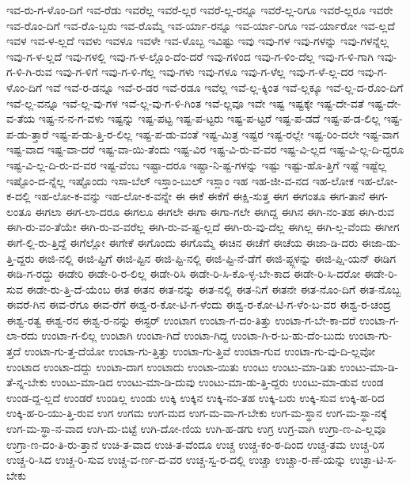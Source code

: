 {ಇವ-ರು-ಗ-ಳೊಂ-ದಿಗೆ
ಇವ-ರೆಡು
ಇವರೆಲ್ಲ
ಇವರೆ-ಲ್ಲರ
ಇವರೆ-ಲ್ಲ-ರನ್ನೂ
ಇವರೆ-ಲ್ಲ-ರಿಗೂ
ಇವರೆ-ಲ್ಲರೂ
ಇವರೇ
ಇವ-ರೊಂ-ದಿಗೆ
ಇವ-ರೊ-ಬ್ಬರು
ಇವ-ರೊಮ್ಮೆ
ಇವ-ರ್ಯಾ-ರನ್ನೂ
ಇವ-ರ್ಯಾ-ರಿಗೂ
ಇವ-ರ್ಯಾರೋ
ಇವ-ಲ್ಲದೆ
ಇವಳ
ಇವ-ಳ-ಲ್ಲದೆ
ಇವಳು
ಇವಳೂ
ಇವಳೇ
ಇವ-ಳೊಬ್ಬ
ಇವಿಷ್ಟು
ಇವು
ಇವು-ಗಳ
ಇವು-ಗಳನ್ನು
ಇವು-ಗಳನ್ನೆಲ್ಲ
ಇವು-ಗ-ಳ-ಲ್ಲದೆ
ಇವು-ಗಳಲ್ಲಿ
ಇವು-ಗ-ಳ-ಲ್ಲೊಂ-ದೆಂ-ದರೆ
ಇವು-ಗಳಿಂದ
ಇವು-ಗ-ಳಿಂ-ದೆಲ್ಲ
ಇವು-ಗ-ಳಿ-ಗಾಗಿ
ಇವು-ಗ-ಳಿ-ಗಿ-ರುವ
ಇವು-ಗ-ಳಿಗೆ
ಇವು-ಗ-ಳಿ-ಗೆಲ್ಲ
ಇವು-ಗಳು
ಇವು-ಗಳೂ
ಇವು-ಗ-ಳೆಲ್ಲ
ಇವು-ಗ-ಳೆ-ಲ್ಲ-ದರ
ಇವು-ಗ-ಳೊಂ-ದಿಗೆ
ಇವೆ
ಇವೆ-ರ-ಡನ್ನೂ
ಇವೆ-ರ-ಡರ
ಇವೆ-ರಡೂ
ಇವೆಲ್ಲ
ಇವೆ-ಲ್ಲ-ಕ್ಕಿಂತ
ಇವೆ-ಲ್ಲಕ್ಕೂ
ಇವೆ-ಲ್ಲ-ದ-ರೊಂ-ದಿಗೆ
ಇವೆ-ಲ್ಲ-ವನ್ನೂ
ಇವೆ-ಲ್ಲ-ವು-ಗಳ
ಇವೆ-ಲ್ಲ-ವು-ಗ-ಳಿ-ಗಿಂತ
ಇವೆ-ಲ್ಲವೂ
ಇವೇ
ಇಷ್ಟ
ಇಷ್ಟಕ್ಕೇ
ಇಷ್ಟ-ದೇ-ವತೆ
ಇಷ್ಟ-ದೇ-ವ-ತೆಯ
ಇಷ್ಟ-ನ-ನ-ಗ-ವಳು
ಇಷ್ಟನ್ನು
ಇಷ್ಟ-ಪಟ್ಟ
ಇಷ್ಟ-ಪ-ಟ್ಟರು
ಇಷ್ಟ-ಪ-ಟ್ಟರೆ
ಇಷ್ಟ-ಪ-ಡದೆ
ಇಷ್ಟ-ಪ-ಡ-ಲಿಲ್ಲ
ಇಷ್ಟ-ಪ-ಡು-ತ್ತಾರೆ
ಇಷ್ಟ-ಪ-ಡು-ತ್ತಿ-ರ-ಲಿಲ್ಲ
ಇಷ್ಟ-ಪ-ಡು-ವಂತೆ
ಇಷ್ಟ-ಮಿತ್ರ
ಇಷ್ಟರ
ಇಷ್ಟ-ರಲ್ಲೇ
ಇಷ್ಟ-ರಿಂ-ದಲೇ
ಇಷ್ಟ-ವಾಗ
ಇಷ್ಟ-ವಾದ
ಇಷ್ಟ-ವಾ-ದರೆ
ಇಷ್ಟ-ವಾ-ಯಿ-ತೆಂದು
ಇಷ್ಟ-ವಿರ
ಇಷ್ಟ-ವಿ-ರು-ವ-ವರ
ಇಷ್ಟ-ವಿ-ಲ್ಲದ
ಇಷ್ಟ-ವಿ-ಲ್ಲ-ದಿ-ದ್ದರೂ
ಇಷ್ಟ-ವಿ-ಲ್ಲ-ದಿ-ರು-ವ-ವರ
ಇಷ್ಟ-ವೆಂಬ
ಇಷ್ಟಾ-ದರೂ
ಇಷ್ಟಾ-ನಿ-ಷ್ಟ-ಗಳನ್ನು
ಇಷ್ಟು
ಇಷ್ಟು-ಹೊ-ತ್ತಿಗೆ
ಇಷ್ಟೆ
ಇಷ್ಟೆಲ್ಲ
ಇಷ್ಟೊಂ-ದ-ನ್ನೆಲ್ಲ
ಇಷ್ಟೊಂದು
ಇಸಾ-ಬೆಲ್
ಇಸ್ತಾಂ-ಬುಲ್
ಇಸ್ಲಾಂ
ಇಹ
ಇಹ-ಜೀ-ವ-ನದ
ಇಹ-ಲೋಕ
ಇಹ-ಲೋ-ಕ-ದಲ್ಲಿ
ಇಹ-ಲೋ-ಕ-ವನ್ನು
ಇಹ-ಲೋ-ಕ-ವನ್ನೇ
ಈ
ಈಕೆ
ಈಕೆಗೆ
ಈಕ್ಷಿ-ಸುತ್ತ
ಈಗ
ಈಗಂತೂ
ಈಗ-ತಾನೆ
ಈಗ-ಲಂತೂ
ಈಗಲಾ
ಈಗ-ಲಾ-ದರೂ
ಈಗಲೂ
ಈಗಲೇ
ಈಗಾ
ಈಗಾ-ಗಲೇ
ಈಗಿದ್ದ
ಈಗಿನ
ಈಗಿ-ನಂ-ತಹ
ಈಗಿ-ರುವ
ಈಗಿ-ರು-ವಂ-ತೆಯೇ
ಈಗಿ-ರು-ವ-ವರೆಲ್ಲ
ಈಗಿ-ರು-ವ-ಷ್ಟ-ಲ್ಲದೆ
ಈಗಿ-ರು-ವು-ದೆಲ್ಲ
ಈಗಿಲ್ಲ
ಈಗಿ-ಲ್ಲ-ವೆಂದು
ಈಗೀಗ
ಈಗೆ-ಲ್ಲಿ-ರು-ತ್ತಿದ್ದೆ
ಈಗೆಲ್ಲೋ
ಈಗೇಕೆ
ಈಗೊಂದು
ಈಗೊಮ್ಮೆ
ಈಚಿನ
ಈಚೆಗೆ
ಈಚೆಯ
ಈಜಾ-ಡಿ-ದರು
ಈಜಾ-ಡು-ತ್ತಿ-ದ್ದರು
ಈಜಿ-ನಲ್ಲಿ
ಈಜಿ-ಪ್ಟಿಗೆ
ಈಜಿ-ಪ್ಟಿನ
ಈಜಿ-ಪ್ಟಿ-ನಲ್ಲಿ
ಈಜಿ-ಪ್ಟಿ-ನೆ-ಡೆಗೆ
ಈಜಿ-ಪ್ಟ್ಗಳನ್ನು
ಈಜಿ-ಪ್ಷಿ-ಯನ್
ಈಡಿಗ
ಈಡಿ-ಗ-ರದ್ದು
ಈಡೇರಿ
ಈಡೇ-ರಿ-ರ-ಲಿಲ್ಲ
ಈಡೇ-ರಿಸಿ
ಈಡೇ-ರಿ-ಸಿ-ಕೊ-ಳ್ಳ-ಬೇ-ಕಾದ
ಈಡೇ-ರಿ-ಸಿ-ದರೋ
ಈಡೇ-ರಿ-ಸುವ
ಈಡೇ-ರು-ತ್ತಿ-ದೆ-ಯೆಂಬ
ಈತ
ಈತನ
ಈತ-ನನ್ನು
ಈತ-ನಲ್ಲಿ
ಈತ-ನಿಗೆ
ಈತನೇ
ಈತ-ನೊಂ-ದಿಗೆ
ಈತ-ನೊಬ್ಬ
ಈವರೆ-ಗಿನ
ಈವ-ರೆಗೂ
ಈವ-ರೆಗೆ
ಈಶ್ವ-ರ-ಕೋ-ಟಿ-ಗ-ಳೆಂದು
ಈಶ್ವ-ರ-ಕೋ-ಟಿ-ಗ-ಳೆಂ-ಬ-ವರ
ಈಶ್ವ-ರ-ಚಂದ್ರ
ಈಶ್ವ-ರತ್ವ
ಈಶ್ವ-ರನ
ಈಶ್ವ-ರ-ನನ್ನು
ಈಸ್ಟರ್
ಉಂಟಾಗ
ಉಂಟಾ-ಗ-ದಂ-ತಿತ್ತು
ಉಂಟಾ-ಗ-ಬೇ-ಕಾ-ದರೆ
ಉಂಟಾ-ಗ-ಲಾ-ರದು
ಉಂಟಾ-ಗ-ಲಿಲ್ಲ
ಉಂಟಾಗಿ
ಉಂಟಾ-ಗಿದೆ
ಉಂಟಾ-ಗಿದ್ದ
ಉಂಟಾ-ಗಿ-ರ-ಬ-ಹು-ದೆಂ-ಬುದು
ಉಂಟಾ-ಗು-ತ್ತದೆ
ಉಂಟಾ-ಗು-ತ್ತ-ದೆಯೋ
ಉಂಟಾ-ಗು-ತ್ತಿತ್ತು
ಉಂಟಾ-ಗು-ತ್ತಿವೆ
ಉಂಟಾ-ಗುವ
ಉಂಟಾ-ಗು-ವು-ದಿ-ಲ್ಲವೋ
ಉಂಟಾದ
ಉಂಟಾ-ದದ್ದು
ಉಂಟಾ-ದಾಗ
ಉಂಟಾದು
ಉಂಟಾ-ಯಿತು
ಉಂಟು
ಉಂಟು-ಮಾ-ಡಿತು
ಉಂಟು-ಮಾ-ಡಿ-ತೆ-ನ್ನ-ಬೇಕು
ಉಂಟು-ಮಾ-ಡಿದ
ಉಂಟು-ಮಾ-ಡಿ-ದುವು
ಉಂಟು-ಮಾ-ಡು-ತ್ತಿ-ದ್ದರು
ಉಂಟು-ಮಾ-ಡುವ
ಉಂಡ
ಉಂಡ-ದ್ದ-ಲ್ಲದೆ
ಉಂಡರೆ
ಉಂಡಿಲ್ಲ
ಉಂಡು
ಉಕ್ಕಿ
ಉಕ್ಕಿನ
ಉಕ್ಕಿ-ನಂ-ತಹ
ಉಕ್ಕಿ-ಬರು
ಉಕ್ಕಿ-ಸುವ
ಉಕ್ಕಿ-ಹ-ರಿದ
ಉಕ್ಕಿ-ಹ-ರಿ-ಯು-ತ್ತಿ-ರುವ
ಉಗ
ಉಗಮ
ಉಗ-ಮದ
ಉಗ-ಮ-ವಾ-ಗ-ಬೇಕು
ಉಗ-ಮ-ಸ್ಥಾನ
ಉಗ-ಮ-ಸ್ಥಾ-ನಕ್ಕೆ
ಉಗ-ಮ-ಸ್ಥಾ-ನ-ವಾದ
ಉಗಿ-ದು-ಬಿಟ್ಟೆ
ಉಗಿ-ದೋ-ಣಿಯ
ಉಗಿ-ಹ-ಡಗು
ಉಗ್ರ
ಉಗ್ರ-ವಾಗಿ
ಉಗ್ರಾ-ಣ-ಎ-ಲ್ಲವೂ
ಉಗ್ರಾ-ಣ-ದಂ-ತಿ-ರು-ತ್ತಾನೆ
ಉಚಿ-ತ-ವಾದ
ಉಚಿ-ತ-ವೆಂದೂ
ಉಚ್ಚ
ಉಚ್ಚ-ಕಂ-ಠ-ದಿಂದ
ಉಚ್ಚ-ತಮ
ಉಚ್ಚ-ರಿಸ
ಉಚ್ಚ-ರಿ-ಸಿದ
ಉಚ್ಚ-ರಿ-ಸುವ
ಉಚ್ಚ-ವ-ರ್ಣ-ದ-ವರ
ಉಚ್ಚ-ಸ್ವ-ರ-ದಲ್ಲಿ
ಉಚ್ಚಾ
ಉಚ್ಚಾ-ರ-ಣೆ-ಯನ್ನು
ಉಚ್ಛಾ-ಟಿ-ಸ-ಬೇಕು
}
